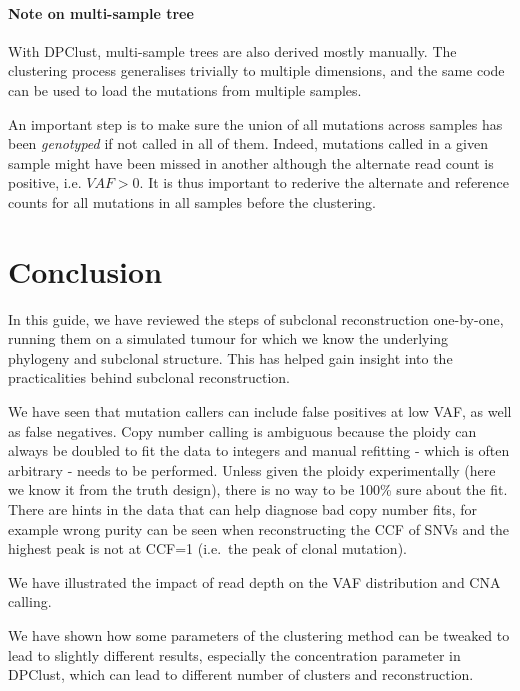 \documentclass[]{article}
\let\oldparagraph\paragraph
\renewcommand{\paragraph}[1]{\oldparagraph{#1}\mbox{}}
\begin{document}
\hypertarget{note-on-multi-sample-tree}{%
\paragraph{Note on multi-sample tree}\label{note-on-multi-sample-tree}}

With DPClust, multi-sample trees are also derived mostly manually. The
clustering process generalises trivially to multiple dimensions, and the
same code can be used to load the mutations from multiple samples.

An important step is to make sure the union of all mutations across
samples has been \emph{genotyped} if not called in all of them. Indeed,
mutations called in a given sample might have been missed in another
although the alternate read count is positive, i.e. \({VAF}>0\). It is
thus important to rederive the alternate and reference counts for all
mutations in all samples before the clustering.

\newpage

\hypertarget{conclusion}{%
\section{Conclusion}\label{conclusion}}

In this guide, we have reviewed the steps of subclonal reconstruction
one-by-one, running them on a simulated tumour for which we know the
underlying phylogeny and subclonal structure. This has helped gain
insight into the practicalities behind subclonal reconstruction.

We have seen that mutation callers can include false positives at low
VAF, as well as false negatives. Copy number calling is ambiguous
because the ploidy can always be doubled to fit the data to integers and
manual refitting - which is often arbitrary - needs to be performed.
Unless given the ploidy experimentally (here we know it from the truth
design), there is no way to be 100\% sure about the fit. There are hints
in the data that can help diagnose bad copy number fits, for example
wrong purity can be seen when reconstructing the CCF of SNVs and the
highest peak is not at CCF=1 (i.e.~the peak of clonal mutation).

We have illustrated the impact of read depth on the VAF distribution and
CNA calling.

We have shown how some parameters of the clustering method can be
tweaked to lead to slightly different results, especially the
concentration parameter in DPClust, which can lead to different number
of clusters and reconstruction.
\end{document}
